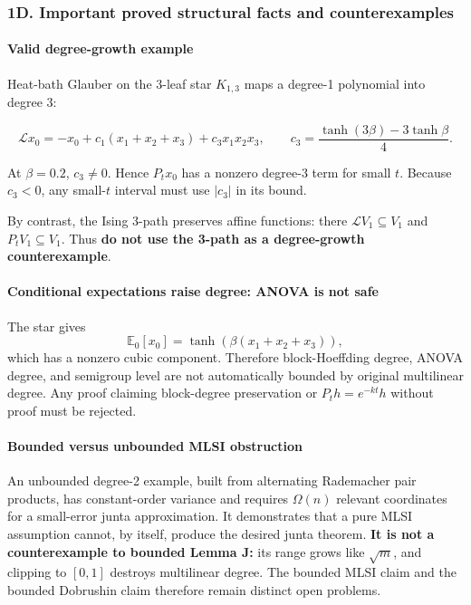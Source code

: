 \subsubsection{1D. Important proved structural facts and counterexamples}\label{d.-important-proved-structural-facts-and-counterexamples}

\paragraph{Valid degree-growth example}\label{valid-degree-growth-example}

Heat-bath Glauber on the 3-leaf star \(K_{1,3}\) maps a degree-1 polynomial into degree 3:

\[\mathcal Lx_0=-x_0+c_1(x_1+x_2+x_3)
+c_3x_1x_2x_3,\qquad
c_3=\frac{\tanh(3\beta)-3\tanh\beta}{4}.\]

At \(\beta=0.2\), \(c_3\neq0\). Hence \(P_tx_0\) has a nonzero degree-3 term for small \(t\). Because \(c_3<0\), any small-\(t\) interval must use \(|c_3|\) in its bound.

By contrast, the Ising 3-path preserves affine functions: there \(\mathcal L V_1\subseteq V_1\) and \(P_tV_1\subseteq V_1\). Thus \textbf{do not use the 3-path as a degree-growth counterexample}.

\paragraph{Conditional expectations raise degree: ANOVA is not safe}\label{conditional-expectations-raise-degree-anova-is-not-safe}

The star gives
\[\mathbb E_0[x_0]=\tanh(\beta(x_1+x_2+x_3)),\]
which has a nonzero cubic component. Therefore block-Hoeffding degree, ANOVA degree, and semigroup level are not automatically bounded by original multilinear degree. Any proof claiming block-degree preservation or \(P_t h=e^{-kt}h\) without proof must be rejected.

\paragraph{Bounded versus unbounded MLSI obstruction}\label{bounded-versus-unbounded-mlsi-obstruction}

An unbounded degree-2 example, built from alternating Rademacher pair products, has constant-order variance and requires \(\Omega(n)\) relevant coordinates for a small-error junta approximation. It demonstrates that a pure MLSI assumption cannot, by itself, produce the desired junta theorem. \textbf{It is not a counterexample to bounded Lemma J:} its range grows like \(\sqrt m\), and clipping to \([0,1]\) destroys multilinear degree. The bounded MLSI claim and the bounded Dobrushin claim therefore remain distinct open problems.

